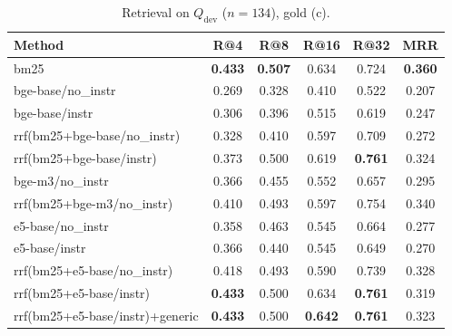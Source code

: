 \begin{table}[t]
\centering
\caption{Retrieval on $Q_{\text{dev}}$ ($n=134$), gold (c).}
\begin{tabular}{lccccc}
\toprule
Method & R@4 & R@8 & R@16 & R@32 & MRR \\
\midrule
bm25 & \textbf{0.433} & \textbf{0.507} & 0.634 & 0.724 & \textbf{0.360} \\
bge-base/no\_instr & 0.269 & 0.328 & 0.410 & 0.522 & 0.207 \\
bge-base/instr & 0.306 & 0.396 & 0.515 & 0.619 & 0.247 \\
rrf(bm25+bge-base/no\_instr) & 0.328 & 0.410 & 0.597 & 0.709 & 0.272 \\
rrf(bm25+bge-base/instr) & 0.373 & 0.500 & 0.619 & \textbf{0.761} & 0.324 \\
bge-m3/no\_instr & 0.366 & 0.455 & 0.552 & 0.657 & 0.295 \\
rrf(bm25+bge-m3/no\_instr) & 0.410 & 0.493 & 0.597 & 0.754 & 0.340 \\
e5-base/no\_instr & 0.358 & 0.463 & 0.545 & 0.664 & 0.277 \\
e5-base/instr & 0.366 & 0.440 & 0.545 & 0.649 & 0.270 \\
rrf(bm25+e5-base/no\_instr) & 0.418 & 0.493 & 0.590 & 0.739 & 0.328 \\
rrf(bm25+e5-base/instr) & \textbf{0.433} & 0.500 & 0.634 & \textbf{0.761} & 0.319 \\
rrf(bm25+e5-base/instr)+generic & \textbf{0.433} & 0.500 & \textbf{0.642} & \textbf{0.761} & 0.323 \\
\bottomrule
\end{tabular}
\end{table}

